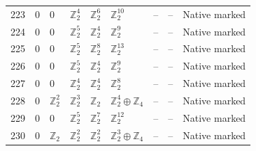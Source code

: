 \documentclass[10pt]{article}
\begin{document}
\begin{longtable}{r|lllll|rrl}
223 & $0$ & $0$ & $\mathbb{Z}_{2}^{4}$ & $\mathbb{Z}_{2}^{6}$ & $\mathbb{Z}_{2}^{10}$ & -- & -- & Native marked\\
224 & $0$ & $0$ & $\mathbb{Z}_{2}^{5}$ & $\mathbb{Z}_{2}^{4}$ & $\mathbb{Z}_{2}^{9}$ & -- & -- & Native marked\\
225 & $0$ & $0$ & $\mathbb{Z}_{2}^{5}$ & $\mathbb{Z}_{2}^{8}$ & $\mathbb{Z}_{2}^{13}$ & -- & -- & Native marked\\
226 & $0$ & $0$ & $\mathbb{Z}_{2}^{5}$ & $\mathbb{Z}_{2}^{4}$ & $\mathbb{Z}_{2}^{9}$ & -- & -- & Native marked\\
227 & $0$ & $0$ & $\mathbb{Z}_{2}^{4}$ & $\mathbb{Z}_{2}^{4}$ & $\mathbb{Z}_{2}^{8}$ & -- & -- & Native marked\\
228 & $0$ & $\mathbb{Z}_{2}^{2}$ & $\mathbb{Z}_{2}^{3}$ & $\mathbb{Z}_{2}$ & $\mathbb{Z}_{2}^{4}\oplus \mathbb{Z}_{4}$ & -- & -- & Native marked\\
229 & $0$ & $0$ & $\mathbb{Z}_{2}^{5}$ & $\mathbb{Z}_{2}^{7}$ & $\mathbb{Z}_{2}^{12}$ & -- & -- & Native marked\\
230 & $0$ & $\mathbb{Z}_{2}$ & $\mathbb{Z}_{2}^{2}$ & $\mathbb{Z}_{2}^{2}$ & $\mathbb{Z}_{2}^{3}\oplus \mathbb{Z}_{4}$ & -- & -- & Native marked\\
\end{longtable}
\end{document}
